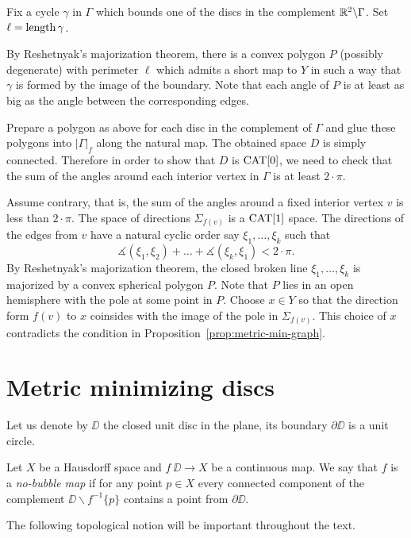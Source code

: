 \documentclass[a4paper,10pt]{amsart}
\begin{document}
Fix a cycle $\gamma$ in $\Gamma$ which bounds one of the discs in the complement $\mathbb{R}^2\backslash \Gamma$.
Set $\ell=\mathop{\rm length}\nolimits\gamma$.

By Reshetnyak's majorization theorem, there is a convex polygon $P$ (possibly degenerate) with perimeter $\ell$ which admits a short map to $Y$ in such a way that $\gamma$ is formed by the image of the boundary.
Note that each angle of $P$ is at least as big as 
the angle between the corresponding edges.

Prepare a polygon as above for each disc in the complement of $\Gamma$
and glue these polygons into $|\Gamma|_f$ along the natural map.
The obtained space $D$ is simply connected.
Therefore in order to show that $D$ is $\mathop{\rm CAT}\nolimits[0]$,
we need to check that the sum of the angles around each interior vertex in $\Gamma$ is at least $2\cdot\pi$.


Assume contrary, that is, 
the sum of the angles around a fixed interior vertex $v$ is less than $2\cdot\pi$.
The space of directions $\Sigma_{f(v)}$ is a $\mathop{\rm CAT}\nolimits[1]$ space.
The directions of the edges from $v$ have a natural
cyclic order say $\xi_1,\dots,\xi_k$
such that
\[\measuredangle(\xi_1,\xi_2)+\dots+\measuredangle(\xi_k,\xi_1)<2\cdot\pi.\]
By Reshetnyak's majorization theorem,
the closed broken line $\xi_1,\dots,\xi_k$ is majorized by a convex spherical polygon $P$.
Note that $P$ lies in an open hemisphere with the pole  at some point in $P$.
Choose $x\in Y$ so that the direction form $f(v)$ to $x$ coinsides with the image of the pole in $\Sigma_{f(v)}$.
This choice of $x$ contradicts the condition in Proposition~\ref{prop:metric-min-graph}.\qeds







\section{Metric minimizing discs}



Let us denote by $\DD$ the closed unit disc in the plane,
its boundary $\partial \DD$ is a unit circle.

Let $X$ be a Hausdorff space and
$f\:\DD\to X$ be a continuous map.
We say that $f$ is a \emph{no-bubble map}
if for any point $p\in X$ every connected component of the complement $\DD\backslash f^{-1}\{p\}$ contains a point from $\partial \DD$.

The following topological notion will be important throughout the text.
\end{document}
